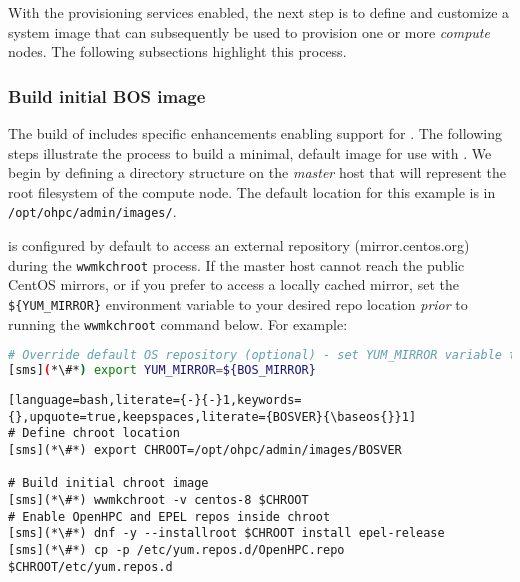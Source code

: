 With the provisioning services enabled, the next step is to define and
customize a system image that can subsequently be used to provision one or more
{\em compute} nodes. The following subsections highlight this process.

\subsubsection{Build initial BOS image} \label{sec:assemble_bos}
The \OHPC{} build of \Warewulf{} includes specific enhancements enabling support for
\baseOS{}. The following steps illustrate the process to build a minimal, default
image for use with \Warewulf{}. We begin by defining a directory structure on the 
{\em master} host that will represent the root filesystem of the compute node. The 
default location for this example is in
\texttt{/opt/ohpc/admin/images/\baseos{}}.

\begin{center}
  \begin{tcolorbox}[]
    \small \Warewulf{} is configured by default to access an external
    repository (mirror.centos.org) during the \texttt{wwmkchroot} process.  If
    the master host cannot reach the public CentOS mirrors, or if you prefer to
    access a locally cached mirror, set the \texttt{\$\{YUM\_MIRROR\}}
    environment variable to your desired repo location {\em prior} to running
    the \texttt{wwmkchroot} command below. For example:

\begin{lstlisting}[language=bash,keywords={}]
# Override default OS repository (optional) - set YUM_MIRROR variable to desired repo location
[sms](*\#*) export YUM_MIRROR=${BOS_MIRROR}
\end{lstlisting}

\end{tcolorbox}
\end{center}

\begin{lstlisting}[language=bash,literate={-}{-}1,keywords={},upquote=true,keepspaces,literate={BOSVER}{\baseos{}}1]
# Define chroot location 
[sms](*\#*) export CHROOT=/opt/ohpc/admin/images/BOSVER

# Build initial chroot image
[sms](*\#*) wwmkchroot -v centos-8 $CHROOT
# Enable OpenHPC and EPEL repos inside chroot
[sms](*\#*) dnf -y --installroot $CHROOT install epel-release
[sms](*\#*) cp -p /etc/yum.repos.d/OpenHPC.repo $CHROOT/etc/yum.repos.d
\end{lstlisting}
